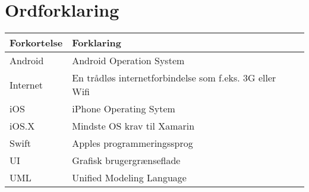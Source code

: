 \chapter*{Ordforklaring}

\begin{tabularx}{\textwidth}{l l X} \hline
	\textbf{Forkortelse}  & \textbf{Forklaring} \\ \hline
	Android& Android Operation System& \\
	Internet& En trådløs internetforbindelse som f.eks. 3G eller Wifi& \\
	iOS&  iPhone Operating Sytem& \\
	iOS.X& Mindste OS krav til Xamarin \\
	Swift& Apples programmeringssprog& \\
	UI& Grafisk brugergrænseflade& \\
	UML& Unified Modeling Language& \\
	
\end{tabularx}